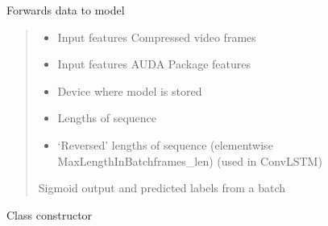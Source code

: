 \documentclass[letterpaper,10pt,english]{sphinxmanual}
\begin{document}
\begin{fulllineitems}
\begin{fulllineitems}
\label{\detokenize{net:net.UVANEMO.__fit}}
\pysigstartsignatures
{}
\pysigstopsignatures
\sphinxAtStartPar
Forwards data to model
\begin{quote}\begin{description}
\begin{itemize}
\item {} 
\sphinxAtStartPar
{} \textendash{} Input features \sphinxhyphen{} Compressed video frames

\item {} 
\sphinxAtStartPar
{} \textendash{} Input features \sphinxhyphen{} AUDA Package features

\item {} 
\sphinxAtStartPar
{} \textendash{} Device where model is stored

\item {} 
\sphinxAtStartPar
{} \textendash{} Lengths of sequence

\item {} 
\sphinxAtStartPar
{} \textendash{} ‘Reversed’ lengths of sequence (element\sphinxhyphen{}wise MaxLengthInBatch\sphinxhyphen{}frames\_len) (used in ConvLSTM)

\end{itemize}

\sphinxAtStartPar
Sigmoid output and predicted labels from a batch

\end{description}\end{quote}

\end{fulllineitems}


\begin{fulllineitems}
\label{\detokenize{net:net.UVANEMO.__init__}}
\pysigstartsignatures
{}
\pysigstopsignatures
\sphinxAtStartPar
Class constructor


\end{fulllineitems}
\end{fulllineitems}
\end{document}
